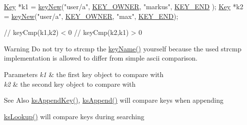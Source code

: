 \begin{DoxyCode}
\hyperlink{classkdb_1_1Key_a5679f5cae63caddd64a60388b9cc77fa}{Key} *k1 = \hyperlink{group__key_gaf6893c038b3ebee90c73a9ea8356bebf}{keyNew}(\textcolor{stringliteral}{"user/a"}, \hyperlink{group__key_gga91fb3178848bd682000958089abbaf40a77ca60362fa8daca8d5347db4385068b}{KEY\_OWNER}, \textcolor{stringliteral}{"markus"}, \hyperlink{group__key_gga91fb3178848bd682000958089abbaf40aa8adb6fcb92dec58fb19410eacfdd403}{KEY\_END}
      );
\hyperlink{classkdb_1_1Key_a5679f5cae63caddd64a60388b9cc77fa}{Key} *k2 = \hyperlink{group__key_gaf6893c038b3ebee90c73a9ea8356bebf}{keyNew}(\textcolor{stringliteral}{"user/a"}, \hyperlink{group__key_gga91fb3178848bd682000958089abbaf40a77ca60362fa8daca8d5347db4385068b}{KEY\_OWNER}, \textcolor{stringliteral}{"max"}, \hyperlink{group__key_gga91fb3178848bd682000958089abbaf40aa8adb6fcb92dec58fb19410eacfdd403}{KEY\_END});

\textcolor{comment}{// keyCmp(k1,k2) < 0}
\textcolor{comment}{// keyCmp(k2,k1) > 0}
\end{DoxyCode}


\begin{DoxyWarning}{Warning}
Do not try to strcmp the \hyperlink{group__keyname_ga8e805c726a60da921d3736cda7813513}{key\-Name()} yourself because the used strcmp implementation is allowed to differ from simple ascii comparison.
\end{DoxyWarning}

\begin{DoxyParams}{Parameters}
{\em k1} & the first key object to compare with \\
\hline
{\em k2} & the second key object to compare with\\
\hline
\end{DoxyParams}
\begin{DoxySeeAlso}{See Also}
\hyperlink{group__keyset_gaa5a1d467a4d71041edce68ea7748ce45}{ks\-Append\-Key()}, \hyperlink{group__keyset_ga21eb9c3a14a604ee3a8bdc779232e7b7}{ks\-Append()} will compare keys when appending 

\hyperlink{group__keyset_gaa34fc43a081e6b01e4120daa6c112004}{ks\-Lookup()} will compare keys during searching 
\end{DoxySeeAlso}



